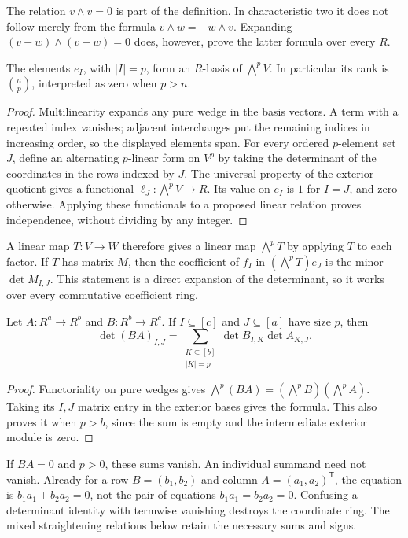 The relation \(v\wedge v=0\) is part of the definition.  In characteristic
two it does not follow merely from the formula
\(v\wedge w=-w\wedge v\).  Expanding \((v+w)\wedge(v+w)=0\) does,
however, prove the latter formula over every \(R\).

\begin{proposition}
The elements \(e_I\), with \(|I|=p\), form an \(R\)-basis of
\(\bigwedge^pV\).  In particular its rank is \(\binom np\), interpreted
as zero when \(p>n\).
\end{proposition}
\begin{proof}
Multilinearity expands any pure wedge in the basis vectors.  A term
with a repeated index vanishes; adjacent interchanges put the remaining
indices in increasing order, so the displayed elements span.  For every
ordered \(p\)-element set \(J\), define an alternating \(p\)-linear form
on \(V^p\) by taking the determinant of the coordinates in the rows
indexed by \(J\).  The universal property of the exterior quotient
gives a functional \(\ell_J:\bigwedge^pV\to R\).
Its value on \(e_I\) is \(1\) for \(I=J\), and zero otherwise.
Applying these functionals to a proposed linear relation proves
independence, without dividing by any integer.
\end{proof}

A linear map \(T:V\to W\) therefore gives a linear map
\(\bigwedge^pT\) by applying \(T\) to each factor.  If \(T\) has
matrix \(M\), then the coefficient of \(f_I\) in
\((\bigwedge^pT)e_J\) is the minor \(\det M_{I,J}\).
This statement is a direct expansion of the determinant, so it works
over every commutative coefficient ring.

\begin{proposition}
Let \(A:R^a\to R^b\) and \(B:R^b\to R^c\).  If \(I\subseteq[c]\)
and \(J\subseteq[a]\) have size \(p\), then
\[
 \det(BA)_{I,J}
   =\sum_{\substack{K\subseteq[b]\\ |K|=p}}
      \det B_{I,K}\det A_{K,J}.
\]
\end{proposition}
\begin{proof}
Functoriality on pure wedges gives
\(\bigwedge^p(BA)=(\bigwedge^pB)(\bigwedge^pA)\).
Taking its \(I,J\) matrix entry in the exterior bases gives the formula.
This also proves it when \(p>b\), since the sum is empty and the
intermediate exterior module is zero.
\end{proof}

If \(BA=0\) and \(p>0\), these sums vanish.  An individual summand need
not vanish.  Already for a row \(B=(b_1,b_2)\) and column
\(A=(a_1,a_2)^{\mathsf T}\), the equation is
\(b_1a_1+b_2a_2=0\), not the pair of equations \(b_1a_1=b_2a_2=0\).
Confusing a determinant identity with termwise vanishing destroys the
coordinate ring.  The mixed straightening relations below retain the
necessary sums and signs.

